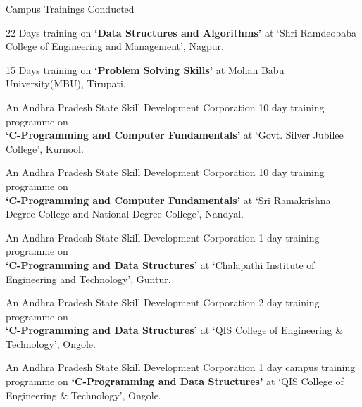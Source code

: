 \documentclass{resume} %
\begin{document}
\begin{rSection}{Campus Trainings Conducted}
	
	\begin{rSubsection}{}{}{}{}	
		\item 22 Days training on \textbf{`Data Structures and Algorithms'} at `Shri Ramdeobaba College of Engineering and Management', Nagpur.
		\item 15 Days training on \textbf{`Problem Solving Skills'} at Mohan Babu University(MBU), Tirupati.
		\item An Andhra Pradesh State Skill Development Corporation 10 day training programme on \\ \textbf{`C-Programming and Computer Fundamentals'} at `Govt. Silver Jubilee College', Kurnool.
		\item An Andhra Pradesh State Skill Development Corporation 10 day training programme on \\ \textbf{`C-Programming and Computer Fundamentals'} at `Sri Ramakrishna Degree College and National Degree College', Nandyal.
		\item An Andhra Pradesh State Skill Development Corporation 1 day training programme on \\ \textbf{`C-Programming and Data Structures'} at `Chalapathi Institute of Engineering and Technology', Guntur.
		\item An Andhra Pradesh State Skill Development Corporation 2 day training programme on \\ \textbf{`C-Programming and Data Structures'} at `QIS College of Engineering \& Technology', Ongole.
		\item An Andhra Pradesh State Skill Development Corporation 1 day campus training programme on \textbf{`C-Programming and
		Data Structures'} at `QIS College of Engineering \& Technology', Ongole.
	\end{rSubsection}
	
	
\end{rSection}
\end{document}

